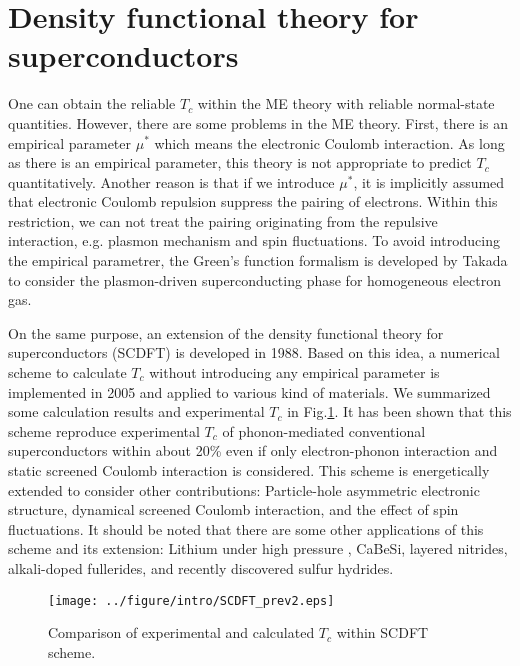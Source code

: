 \section{Density functional theory for superconductors}

One can obtain the reliable $T_c$ within the ME theory with reliable normal-state quantities.
However, there are some problems in the ME theory. First, there is an empirical parameter $\mu^{\ast}$
which means the electronic Coulomb interaction. As long as there is an empirical parameter, 
this theory is not appropriate to predict $T_c$ quantitatively.
Another reason is that if we introduce $\mu^{\ast}$, it is implicitly assumed that electronic
Coulomb repulsion suppress the pairing of electrons. Within this restriction, we can not treat the
pairing originating from the repulsive interaction, e.g. plasmon mechanism and spin fluctuations.
To avoid introducing the empirical parametrer, the Green's function formalism is developed by Takada
\cite{Takada1978plasmon} to consider the plasmon-driven superconducting phase for homogeneous electron gas.

On the same purpose, an extension of the density functional theory for superconductors (SCDFT)
is developed in 1988\cite{Oliveira1988}. Based on this idea, a numerical scheme to calculate
$T_c$ without introducing any empirical parameter is implemented in 2005\cite{Luders2005} 
and applied to various kind of materials. We summarized some calculation results and experimental 
$T_c$ in Fig.\ref{fig:scdft_compare}. It has been shown that this scheme reproduce experimental $T_c$ 
of phonon-mediated conventional superconductors within about 20\% even if only electron-phonon 
interaction and static screened Coulomb interaction is considered.
This scheme is energetically extended to consider other contributions:
Particle-hole asymmetric electronic structure\cite{RA2013phasy}, dynamical screened Coulomb 
interaction\cite{RA2013}, and the effect of spin fluctuations\cite{Essenberger2014}.
It should be noted that there are some other applications of this scheme and its extension: 
Lithium under high pressure
\cite{Profeta2006Pressure, RA2013}, CaBeSi\cite{Bersier2009CaBeSi}, layered nitrides\cite{RA2012}, 
alkali-doped fullerides\cite{RA2013alkali}, and recently discovered sulfur hydrides\cite{RA2015}.

\begin{figure} %
	\centering
	\texttt{[image: ../figure/intro/SCDFT\_prev2.eps]}
	\caption{Comparison of experimental and calculated $T_c$ 
		within SCDFT scheme\cite{Marques2005, Sanna2007, Floris2005}.}
	\label{fig:scdft_compare}
\end{figure}

